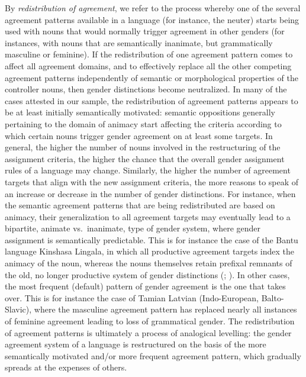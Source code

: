 \documentclass[output=collectionpaper]{langsci/langscibook}
\begin{document}
By \textit{redistribution of agreement}, we refer to the process whereby one of the several agreement patterns available in a language (for instance, the neuter) starts being used with nouns that would normally trigger agreement in other genders (for instances, with nouns that are semantically inanimate, but grammatically masculine or feminine). If the redistribution of one agreement pattern comes to affect all agreement domains, and to effectively replace all the other competing agreement patterns independently of semantic or morphological properties of the controller nouns, then gender distinctions become neutralized. In many of the cases attested in our sample, the redistribution of agreement patterns appears to be at least initially semantically motivated: semantic oppositions generally pertaining to the domain of animacy start affecting the criteria according to which certain nouns trigger gender agreement on at least some targets. In general, the higher the number of nouns involved in the restructuring of the assignment criteria, the higher the chance that the overall gender assignment rules of a language may change. Similarly, the higher the number of agreement targets that align with the new assignment criteria, the more reasons to speak of an increase or decrease in the number of gender distinctions. For instance, when the semantic agreement patterns that are being redistributed are based on animacy, their generalization to all agreement targets may eventually lead to a bipartite, animate vs.\ inanimate, type of gender system, where gender assignment is semantically predictable. This is for instance the case of the Bantu language Kinshasa Lingala, in which all productive agreement targets index the animacy of the noun, whereas the nouns themselves retain prefixal remnants of the old, no longer productive system of gender distinctions (\citealt[130--132]{Maho1999}; \citealt[28--29]{Meeuwis2013}). In other cases, the most frequent (default) pattern of gender agreement is the one that takes over. This is for instance the case of Tamian Latvian (Indo-European, Balto-Slavic), where the masculine agreement pattern has replaced nearly all instances of feminine agreement leading to loss of grammatical gender. The redistribution of agreement patterns is ultimately a process of analogical levelling: the gender agreement system of a language is restructured on the basis of the more semantically motivated and/or more frequent agreement pattern, which gradually spreads at the expenses of others.
\end{document}
